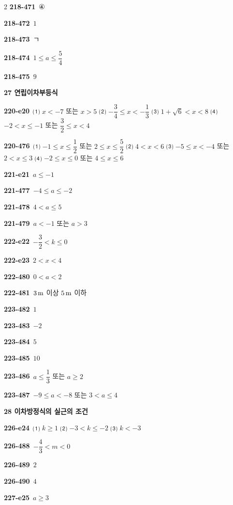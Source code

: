 \documentclass[10pt,a4paper]{article}
\begin{document}
\begin{multicols}{2}
\noindent\textbf{218-471}\ ④\par
\noindent\textbf{218-472}\ $1$\par
\noindent\textbf{218-473}\ ㄱ\par
\noindent\textbf{218-474}\ $1\le a\le \dfrac{5}{4}$\par
\noindent\textbf{218-475}\ $9$\par
\noindent\textbf{27 연립이차부등식}\par\smallskip
\noindent\textbf{220-e20}\ ⑴ $x<-7$ 또는 $x>5$ ⑵ $-\dfrac{3}{4}\le x<-\dfrac{1}{3}$ ⑶ $1+\sqrt{6}<x<8$ ⑷ $-2<x\le -1$ 또는 $\dfrac{3}{2}\le x<4$\par
\noindent\textbf{220-476}\ ⑴ $-1\le x\le \dfrac{1}{2}$ 또는 $2\le x\le \dfrac{5}{2}$ ⑵ $4<x<6$ ⑶ $-5\le x<-4$ 또는 $2<x\le 3$ ⑷ $-2\le x\le 0$ 또는 $4\le x\le 6$\par
\noindent\textbf{221-e21}\ $a\le -1$\par
\noindent\textbf{221-477}\ $-4\le a\le -2$\par
\noindent\textbf{221-478}\ $4<a\le 5$\par
\noindent\textbf{221-479}\ $a<-1$ 또는 $a>3$\par
\noindent\textbf{222-e22}\ $-\dfrac{3}{2}<k\le 0$\par
\noindent\textbf{222-e23}\ $2<x<4$\par
\noindent\textbf{222-480}\ $0<a<2$\par
\noindent\textbf{222-481}\ $3\mkern3mu \mathrm{m}$ 이상 $5\mkern3mu \mathrm{m}$ 이하\par
\noindent\textbf{223-482}\ $1$\par
\noindent\textbf{223-483}\ $-2$\par
\noindent\textbf{223-484}\ $5$\par
\noindent\textbf{223-485}\ $10$\par
\noindent\textbf{223-486}\ $a\le \dfrac{1}{3}$ 또는 $a\ge 2$\par
\noindent\textbf{223-487}\ $-9\le a<-8$ 또는 $3<a\le 4$\par
\noindent\textbf{28 이차방정식의 실근의 조건}\par\smallskip
\noindent\textbf{226-e24}\ ⑴ $k\ge 1$ ⑵ $-3<k\le -2$ ⑶ $k<-3$\par
\noindent\textbf{226-488}\ $-\dfrac{4}{3}<m<0$\par
\noindent\textbf{226-489}\ $2$\par
\noindent\textbf{226-490}\ $4$\par
\noindent\textbf{227-e25}\ $a\ge 3$\par

\end{multicols}
\end{document}
